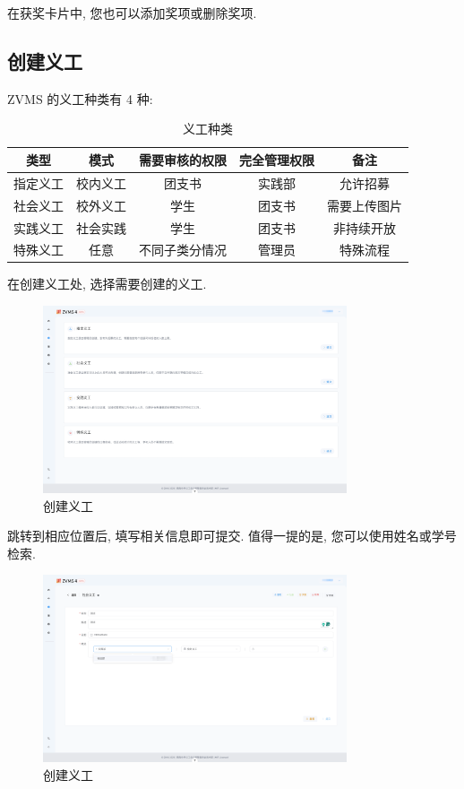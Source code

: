 \documentclass{article}
\begin{document}
在获奖卡片中, 您也可以添加奖项或删除奖项.

\subsection{创建义工}

ZVMS 的义工种类有 4 种:

\begin{table}[H]
  \centering
  \begin{tabular}{ccccc}
    \hline
    \textbf{类型} & \textbf{模式} & \textbf{需要审核的权限} & \textbf{完全管理权限} & \textbf{备注} \\
    \hline
    指定义工 & 校内义工 & 团支书 & 实践部 & 允许招募 \\
    社会义工 & 校外义工 & 学生 & 团支书 & 需要上传图片 \\
    实践义工 & 社会实践 & 学生 & 团支书 & 非持续开放 \\
    特殊义工 & 任意 & 不同子类分情况 & 管理员 & 特殊流程 \\
    \hline
  \end{tabular}
  \caption{义工种类}
  \label{tab:volunteer-type}
\end{table}

在创建义工处, 选择需要创建的义工.

\begin{figure}[H]
  \centering
  \includegraphics[width=0.8\textwidth]{../assets/image-20240303164004927.png}
  \caption{创建义工}
  \label{fig:volunteer-create}
\end{figure}

跳转到相应位置后, 填写相关信息即可提交. 值得一提的是, 您可以使用姓名或学号检索.

\begin{figure}[H]
  \centering
  \includegraphics[width=0.8\textwidth]{../assets/image-20240303164108600.png}
  \caption{创建义工}
  \label{fig:volunteer-create-search}
\end{figure}
\end{document}
